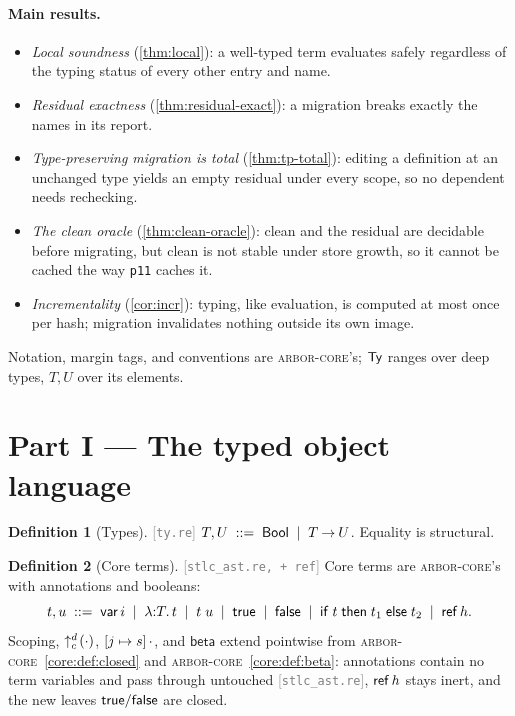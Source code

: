 \documentclass[11pt]{article}
\theoremstyle{definition}
\newtheorem{definition}{Definition}[section]
\theoremstyle{plain}
\theoremstyle{remark}
\newcommand{\src}[1]{{\footnotesize\textcolor{gray}{[\texttt{#1}]}}}
\newcommand{\arborcore}{\textsc{arbor-core}}
\newcommand{\coreref}[1]{\arborcore~\cref{core:#1}}
\begin{document}
\paragraph{Main results.}
\begin{itemize}[nosep]
  \item \emph{Local soundness} (\cref{thm:local}): a well-typed term evaluates safely
  regardless of the typing status of every other entry and name.
  \item \emph{Residual exactness} (\cref{thm:residual-exact}): a migration breaks exactly
  the names in its report.
  \item \emph{Type-preserving migration is total} (\cref{thm:tp-total}): editing a
  definition at an unchanged type yields an empty residual under every scope, so no
  dependent needs rechecking.
  \item \emph{The clean oracle} (\cref{thm:clean-oracle}): clean and the residual are
  decidable before migrating, but clean is not stable under store growth, so it cannot be
  cached the way \texttt{p11} caches it.
  \item \emph{Incrementality} (\cref{cor:incr}): typing, like evaluation, is computed at
  most once per hash; migration invalidates nothing outside its own image.
\end{itemize}

\bigskip
Notation, margin tags, and conventions are \arborcore{}'s; $\mathsf{Ty}$ ranges over deep types,
$T,U$ over its elements.

\section{Part I --- The typed object language}\label{sec:lang}

\begin{definition}[Types]\label{def:ty}
\src{ty.re} $T, U \;::=\; \mathsf{Bool} \;\mid\; T \mathbin{\to} U$. Equality is structural.
\end{definition}

\begin{definition}[Core terms]\label{def:core}
\src{stlc\_ast.re, +\,ref} Core terms are \arborcore{}'s with annotations and booleans:
\[
  t,u \;::=\; \mathsf{var}\,i \;\mid\; \lambda{:}T.\,t \;\mid\; t\;u \;\mid\;
  \mathsf{true} \;\mid\; \mathsf{false} \;\mid\; \mathsf{if}\;t\;\mathsf{then}\;t_1\;\mathsf{else}\;t_2 \;\mid\; \mathsf{ref}\,h.
\]
Scoping, $\uparrow^{d}_{c}\!\left(\cdot\right)$, $[j \mapsto s]\,\cdot$, and $\mathsf{beta}$ extend pointwise
from \coreref{def:closed} and \coreref{def:beta}: annotations contain no term variables and
pass through untouched \src{stlc\_ast.re}, $\mathsf{ref}\,h$ stays inert, and the new leaves
$\mathsf{true}/\mathsf{false}$ are closed.
\end{definition}
\end{document}
